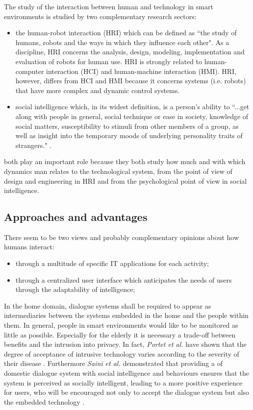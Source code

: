 \documentclass{thesisreport}
\begin{document}
 The study of the interaction between human and technology in smart environments is studied by two complementary research sectors:
 \begin{itemize}
    \item the human-robot interaction (HRI) which can be defined as ``the study of humans, robots and the ways in which they influence each other". As a discipline, HRI concerns the analysis, design, modeling, implementation and evaluation of robots for human use.
    HRI is strongly related to human-computer interaction (HCI) and human-machine interaction (HMI). HRI, however, differs from HCI and HMI because it concerns systems (i.e. robots) that have more complex and dynamic control systems.
     
    \item social intelligence which, in its widest definition, is a person's ability to ``...get along with people in general, social technique or ease in society, knowledge of social matters, susceptibility to stimuli from other members of a group, as well as insight into the temporary moods of underlying personality traits of strangers." \cite{vernon1933some}.
 \end{itemize}

 both play an important role because they both study how much and with which dynamics man relates to the technological system, from the point of view of design and engineering in HRI and from the psychological point of view in social intelligence.

 \subsection{Approaches and advantages}
 There seem to be two views and probably complementary opinions about how humans interact:
 \begin{itemize}
     \item through a multitude of specific IT applications for each activity;
     \item through a centralized user interface which anticipates the needs of users through the adaptability of intelligence;
 \end{itemize}
 In the home domain, dialogue systems shall be required to appear as intermediaries between the systems embedded in the home and the people within them.
 In general, people in smart environments would like to be monitored as little as possible. Especially for the elderly it is necessary a trade-off between benefits and the intrusion into privacy. In fact, \textit{Portet et al.} have shown that the degree of acceptance of intrusive technology varies according to the severity of their disease \cite{portet2013design}. 
 Furthermore \textit{Saini et al.} demonstrated that providing a  of domestic dialogue system with social intelligence and behaviours ensures that the system is perceived as socially intelligent, leading to a more positive experience for users, who will be encouraged not only to accept the dialogue system but also the embedded technology \cite{saini2005benefits}.
 
\end{document}
